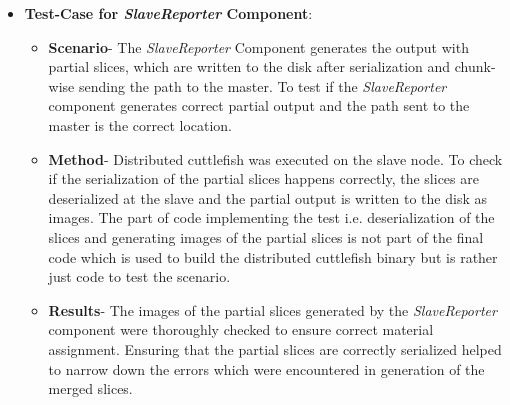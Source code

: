\begin{enumerate}
\begin{itemize}
\item{\textbf{Test-Case for \textit{SlaveReporter} Component}}: 
\begin{itemize}
\item{\textbf{Scenario}}- The \textit{SlaveReporter} Component generates the output with partial slices, which are written to the disk after serialization and chunk-wise sending the path to the master. To test if the \textit{SlaveReporter} component generates correct partial output and the path sent to the master is the correct location.
\item{\textbf{Method}}- Distributed cuttlefish was executed on the slave node. To check if the serialization of the partial slices happens correctly, the slices are deserialized at the slave and the partial output is written to the disk as images. The part of code implementing the test i.e. deserialization of the slices and generating images of the partial slices is not part of the final code which is used to build the distributed cuttlefish binary but is rather just code to test the scenario. 
\item{\textbf{Results}}- The images of the partial slices generated by the \textit{SlaveReporter} component were thoroughly checked to ensure correct material assignment. Ensuring that the partial slices are correctly serialized helped to narrow down the errors which were encountered in generation of the merged slices.  
\end{itemize}


\end{itemize}
\end{enumerate}

